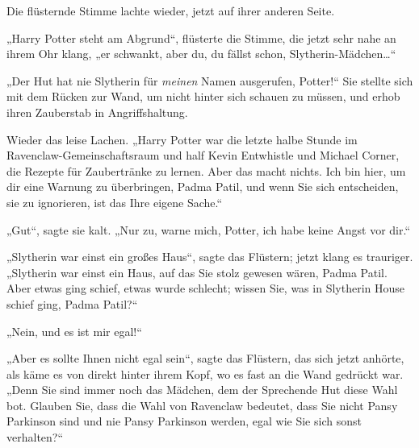 Die flüsternde Stimme lachte wieder, jetzt auf ihrer anderen Seite.

„Harry Potter steht am Abgrund“, flüsterte die Stimme, die jetzt sehr nahe an ihrem Ohr klang, „er schwankt, aber du, du fällst schon, Slytherin-Mädchen…“

„Der Hut hat nie Slytherin für \emph{meinen} Namen ausgerufen, Potter!“ Sie stellte sich mit dem Rücken zur Wand, um nicht hinter sich schauen zu müssen, und erhob ihren Zauberstab in Angriffshaltung.

Wieder das leise Lachen. „Harry Potter war die letzte halbe Stunde im Ravenclaw-Gemeinschaftsraum und half Kevin Entwhistle und Michael Corner, die Rezepte für Zaubertränke zu lernen. Aber das macht nichts. Ich bin hier, um dir eine Warnung zu überbringen, Padma Patil, und wenn Sie sich entscheiden, sie zu ignorieren, ist das Ihre eigene Sache.“

„Gut“, sagte sie kalt. „Nur zu, warne mich, Potter, ich habe keine Angst vor dir.“

„Slytherin war einst ein großes Haus“, sagte das Flüstern; jetzt klang es trauriger. „Slytherin war einst ein Haus, auf das Sie stolz gewesen wären, Padma Patil. Aber etwas ging schief, etwas wurde schlecht; wissen Sie, was in Slytherin House schief ging, Padma Patil?“

„Nein, und es ist mir egal!“

„Aber es sollte Ihnen nicht egal sein“, sagte das Flüstern, das sich jetzt anhörte, als käme es von direkt hinter ihrem Kopf, wo es fast an die Wand gedrückt war. „Denn Sie sind immer noch das Mädchen, dem der Sprechende Hut diese Wahl bot. Glauben Sie, dass die Wahl von Ravenclaw bedeutet, dass Sie nicht Pansy Parkinson sind und nie Pansy Parkinson werden, egal wie Sie sich sonst verhalten?“

